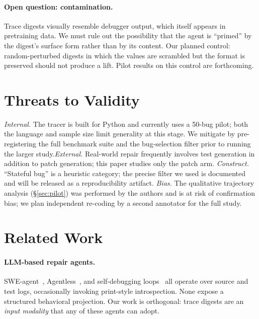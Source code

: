 \documentclass[sigconf,review,anonymous,nonacm]{acmart}
\begin{document}
\paragraph{Open question: contamination.} Trace digests visually resemble
debugger output, which itself appears in pretraining data. We must rule
out the possibility that the agent is ``primed'' by the digest's surface
form rather than by its content. Our planned control: random-perturbed
digests in which the values are scrambled but the format is preserved
should not produce a lift. Pilot results on this control are forthcoming.

\section{Threats to Validity}
\label{sec:threats}

\noindent\emph{Internal.} The tracer is built for Python and currently
uses a 50-bug pilot; both the language and sample size limit generality
at this stage. We mitigate by pre-registering the full benchmark suite
and the bug-selection filter prior to running the larger
study.\;\emph{External.} Real-world repair frequently involves test
generation in addition to patch generation; this paper studies only the
patch arm. \emph{Construct.} ``Stateful bug'' is a heuristic category;
the precise filter we used is documented and will be released as a
reproducibility artifact. \emph{Bias.} The qualitative trajectory analysis
(\S\ref{sec:pilot}) was performed by the authors and is at risk of
confirmation bias; we plan independent re-coding by a second annotator
for the full study.

\section{Related Work}
\label{sec:related}

\paragraph{LLM-based repair agents.} SWE-agent~\cite{yang2024sweagent},
Agentless~\cite{xia2024agentless}, and self-debugging
loops~\cite{chen2023selfdebug,shinn2023reflexion} all operate over source
and test logs, occasionally invoking print-style introspection. None
expose a structured behavioral projection. Our work is orthogonal: trace
digests are an \emph{input modality} that any of these agents can adopt.
\end{document}
